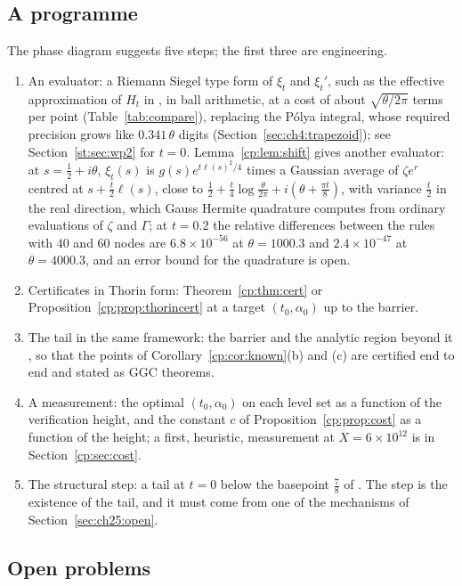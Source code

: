 \subsection{A programme}\label{cp:sec:programme}

The phase diagram suggests five steps; the first three are engineering.
\begin{enumerate}
\item An evaluator: a Riemann Siegel type form of $\xi_t$ and $\xi_t'$, such as the effective approximation of $H_t$ in \cite{Polymath}, in ball arithmetic, at a cost of about $\sqrt{\theta/2\pi}$ terms per point (Table~\ref{tab:compare}), replacing the P\'olya integral, whose required precision grows like $0.341\,\theta$ digits (Section~\ref{sec:ch4:trapezoid}); see Section~\ref{st:sec:wp2} for $t=0$. Lemma~\ref{cp:lem:shift} gives another evaluator: at $s=\frac12+i\theta$, $\xi_t(s)$ is $g(s)e^{t\ell(s)^2/4}$ times a Gaussian average of $\zeta e^{r}$ centred at $s+\frac t2\ell(s)$, close to $\frac12+\frac t4\log\frac\theta{2\pi}+i(\theta+\frac{\pi t}8)$, with variance $\frac t2$ in the real direction, which Gauss Hermite quadrature computes from ordinary evaluations of $\zeta$ and $\Gamma$; at $t=0.2$ the relative differences between the rules with $40$ and $60$ nodes are $6.8\times10^{-56}$ at $\theta=1000.3$ and $2.4\times10^{-47}$ at $\theta=4000.3$, and an error bound for the quadrature is open.
\item Certificates in Thorin form: Theorem~\ref{cp:thm:cert} or Proposition~\ref{cp:prop:thorincert} at a target $(t_0,\alpha_0)$ up to the barrier.
\item The tail in the same framework: the barrier and the analytic region beyond it \cite{Polymath}, so that the points of Corollary~\ref{cp:cor:known}(b) and (c) are certified end to end and stated as GGC theorems.
\item A measurement: the optimal $(t_0,\alpha_0)$ on each level set as a function of the verification height, and the constant $c$ of Proposition~\ref{cp:prop:cost} as a function of the height; a first, heuristic, measurement at $X=6\times10^{12}$ is in Section~\ref{cp:sec:cost}.
\item The structural step: a tail at $t=0$ below the basepoint $\frac78$ of \cite{OAI26a}. The step is the existence of the tail, and it must come from one of the mechanisms of Section~\ref{sec:ch25:open}.
\end{enumerate}

\subsection{Open problems}\label{cp:sec:open}

